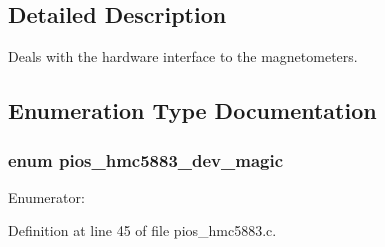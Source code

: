 \subsection{\-Detailed \-Description}
\-Deals with the hardware interface to the magnetometers. 

\subsection{\-Enumeration \-Type \-Documentation}
\hypertarget{group___p_i_o_s___h_m_c5883_ga694f4a1224c19ea7205e8865132bc4c8}{
\subsubsection[{pios\-\_\-hmc5883\-\_\-dev\-\_\-magic}]{\setlength{\rightskip}{0pt plus 5cm}enum {\bf pios\-\_\-hmc5883\-\_\-dev\-\_\-magic}}}\label{group___p_i_o_s___h_m_c5883_ga694f4a1224c19ea7205e8865132bc4c8}
\begin{Desc}
\item[\-Enumerator\-: ]\par
\begin{description}
\item[{\em 
\hypertarget{group___p_i_o_s___h_m_c5883_gga694f4a1224c19ea7205e8865132bc4c8a8a6521f0bc2fd12e7b8b34562bfa845c}{\-P\-I\-O\-S\-\_\-\-H\-M\-C5883\-\_\-\-D\-E\-V\-\_\-\-M\-A\-G\-I\-C}\label{group___p_i_o_s___h_m_c5883_gga694f4a1224c19ea7205e8865132bc4c8a8a6521f0bc2fd12e7b8b34562bfa845c}
}]\end{description}
\end{Desc}



\-Definition at line 45 of file pios\-\_\-hmc5883.\-c.

